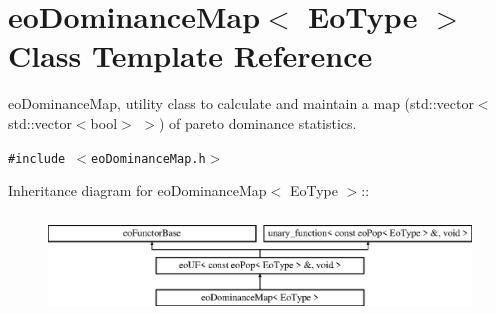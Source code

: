 \section{eo\-Dominance\-Map$<$ Eo\-Type $>$ Class Template Reference}
\label{classeo_dominance_map}
eo\-Dominance\-Map, utility class to calculate and maintain a map (std::vector$<$std::vector$<$bool$>$ $>$) of pareto dominance statistics.  


{\tt \#include $<$eo\-Dominance\-Map.h$>$}

Inheritance diagram for eo\-Dominance\-Map$<$ Eo\-Type $>$::\begin{figure}[H]
\begin{center}
\leavevmode
\includegraphics[height=2.67516cm]{classeo_dominance_map}
\end{center}
\end{figure}

